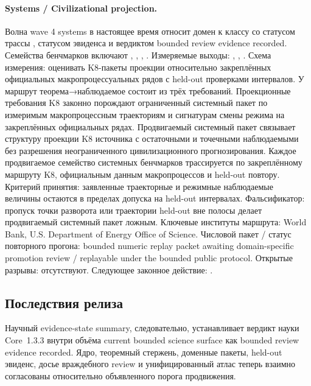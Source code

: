 \paragraph{Systems / Civilizational projection.}
Волна wave 4 systems в настоящее время относит домен к классу  со статусом трассы , статусом эвиденса  и вердиктом bounded review evidence recorded.
Семейства бенчмарков включают , \allowbreak {}, \allowbreak {}, \allowbreak {}.
Измеряемые выходы: , \allowbreak {}, \allowbreak {}.
Схема измерения: оценивать K8-пакеты проекции относительно закреплённых официальных макропроцессуальных рядов с held-out проверками интервалов.
У маршрут теорема→наблюдаемое состоит из трёх требований. Проекционные требования K8 законно порождают ограниченный системный пакет по измеримым макропроцессным траекториям и сигнатурам смены режима на закреплённых официальных рядах. Продвигаемый системный пакет связывает структуру проекции K8 источника с остаточными и точечными наблюдаемыми без разрешения неограниченного цивилизационного прогнозирования. Каждое продвигаемое семейство системных бенчмарков трассируется по закреплённому маршруту K8, официальным данным макропроцессов и held-out повтору.
Критерий принятия: заявленные траекторные и режимные наблюдаемые величины остаются в пределах допуска на held-out интервалах.
Фальсификатор: пропуск точки разворота или траектории held-out вне полосы делает продвигаемый системный пакет ложным.
Ключевые институты маршрута: World Bank, \allowbreak U.S. Department of Energy Office of Science.
Числовой пакет / статус повторного прогона: bounded numeric replay packet awaiting domain-specific promotion review / replayable under the bounded public protocol.
Открытые разрывы: отсутствуют.
Следующее законное действие: .

\subsection{Последствия релиза}
Научный evidence-state summary, следовательно, устанавливает вердикт науки Core~1.3.3 внутри объёма current bounded science surface как bounded review evidence recorded.
Ядро, теоремный стержень, доменные пакеты, held-out эвиденс, досье враждебного review и унифицированный атлас теперь взаимно согласованы относительно объявленного порога продвижения.
